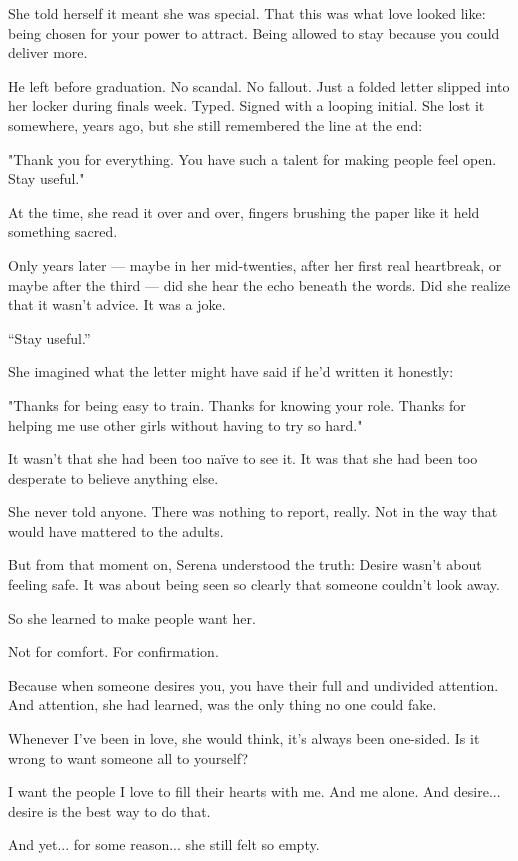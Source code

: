She told herself it meant she was special.
That this was what love looked like: being chosen for your power to attract.
Being allowed to stay because you could deliver more.

He left before graduation.
No scandal. No fallout.
Just a folded letter slipped into her locker during finals week.
Typed. Signed with a looping initial.
She lost it somewhere, years ago, but she still remembered the line at the end:

"Thank you for everything. You have such a talent for making people feel open. Stay useful."

At the time, she read it over and over, fingers brushing the paper like it held something sacred.

Only years later — maybe in her mid-twenties, after her first real heartbreak, or maybe after the third —
did she hear the echo beneath the words.
Did she realize that it wasn’t advice.
It was a joke.

“Stay useful.”

She imagined what the letter might have said if he’d written it honestly:

"Thanks for being easy to train. Thanks for knowing your role. Thanks for helping me use other girls without having to try so hard."

It wasn’t that she had been too naïve to see it.
It was that she had been too desperate to believe anything else.

She never told anyone.
There was nothing to report, really.
Not in the way that would have mattered to the adults.

But from that moment on, Serena understood the truth:
Desire wasn’t about feeling safe.
It was about being seen so clearly that someone couldn’t look away.

So she learned to make people want her.

Not for comfort.
For confirmation.

Because when someone desires you, you have their full and undivided attention.
And attention, she had learned, was the only thing no one could fake.

Whenever I’ve been in love, she would think, it’s always been one-sided.
Is it wrong to want someone all to yourself?

I want the people I love to fill their hearts with me. And me alone.
And desire... desire is the best way to do that.

And yet... for some reason... she still felt so empty.

